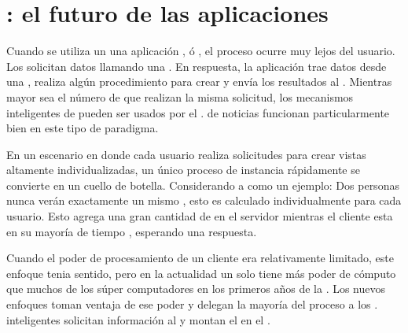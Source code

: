 
\section{\isomorphicAS \javaScriptNAME : el futuro de las aplicaciones \webINT}\label{cap:estadoArte:section:web_app}
Cuando se utiliza un \backendAS \runningCPT una aplicación \javaNAME, \phpNAME ó \railsNAME, el proceso ocurre muy lejos del usuario. Los \clientsAS solicitan datos llamando una \uriNAME. En respuesta, la aplicación trae datos desde una \dataBaseDB, realiza algún procedimiento para crear \htmlNAME y envía los resultados al \clientAS. Mientras mayor sea el número de \clientsAS que realizan la misma solicitud, los mecanismos inteligentes de \caching pueden ser usados por el \serverAS. \sitesINT de noticias funcionan particularmente bien en este tipo de paradigma.

En un escenario en donde cada usuario realiza solicitudes para crear vistas altamente individualizadas, un único proceso de instancia rápidamente se convierte en un cuello de botella. Considerando a \facebook como un ejemplo: Dos personas nunca verán exactamente un mismo \facebookwall, esto es calculado individualmente para cada usuario. Esto agrega una gran cantidad de \stress en el servidor mientras el cliente esta en su mayoría de tiempo \idle, esperando una respuesta.

Cuando el poder de procesamiento de un cliente era relativamente limitado, este enfoque tenia sentido, pero en la actualidad un solo \smartphoneCPT tiene más poder de cómputo que muchos de los súper computadores en los primeros años de la \webINT. Los nuevos enfoques toman ventaja de ese poder y delegan la mayoría del proceso a los \clientsAS. \frontEndsAS inteligentes solicitan información al \serverAS y montan el \htmldomNAME en el \browserINT.

